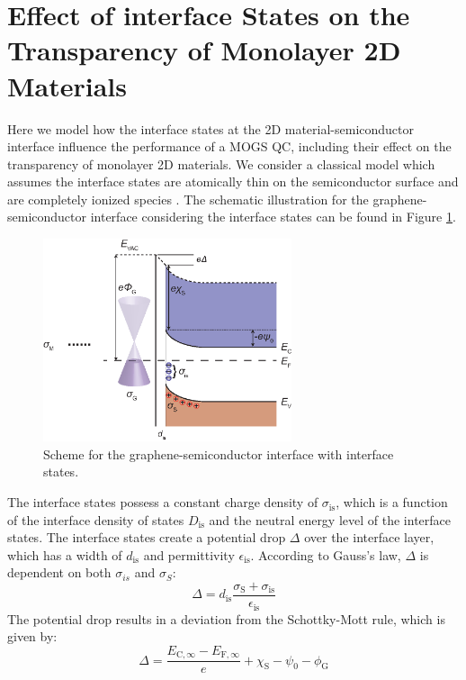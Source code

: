\documentclass[manuscript=suppinfo]{achemso}
\newcommand*\subs[1]{_{\text{#1}}} %
\begin{document}
\section{Effect of interface States on the Transparency of Monolayer 2D Materials} 
Here we model how the interface states at the 2D material-semiconductor interface influence the performance of a MOGS QC,
including their effect on the transparency of monolayer 2D materials.
We consider a classical model which assumes the interface states are atomically thin on the semiconductor surface and are completely ionized species \cite{Sze1965, Heine1965, Sze2006Mosfets}. 
The schematic illustration for the graphene-semiconductor interface considering the interface states can be found in Figure \ref{fig:scheme-interface}.
\begin{figure}[htbp]
  \centering
  \includegraphics[width=0.65\textwidth]{img/scheme_interfacial.eps}
  \caption{Scheme for the graphene-semiconductor interface with interface states.}
  \label{fig:scheme-interface}
\end{figure}
The interface states possess a constant charge density of $\sigma\subs{is}$, which is a function of the interface density of states $D\subs{is}$ and the neutral energy level of the interface states.
The interface states create a potential drop $\Delta$ over the interface layer, which has a width of $d\subs{is}$ and permittivity $\epsilon\subs{is}$.
According to Gauss's law, $\Delta$ is dependent on both $\sigma_{is}$ and $\sigma_{S}$:
\begin{equation}
  \Delta = d\subs{is}\frac{\sigma\subs{S}+\sigma\subs{is}}{\epsilon\subs{is}}
  \label{eqn:delta_1}
\end{equation}
The potential drop results in a deviation from the Schottky-Mott rule, which is given by:
\begin{equation}
  \Delta = \frac{E_{\mathrm C,\infty} - E_{\mathrm F,\infty}}{e} + \chi\subs{S} -\psi_0 - \phi\subs{G}
  \label{eqn:delta_2}
\end{equation}
\end{document}
